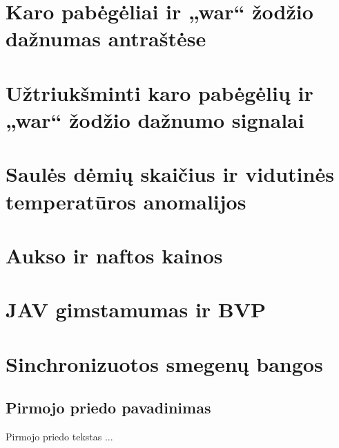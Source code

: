 \documentclass[a4paper,12pt,fleqn]{article}
\begin{document}
    {}{}{}{}%
    {}

    \tableofcontents

    

    \section{Karo pabėgėliai ir „war“ žodžio dažnumas antraštėse}
    \label{sec:refugees}
    

    \section{Užtriukšminti karo pabėgėlių ir „war“ žodžio dažnumo signalai}
    \label{sec:noisy-refugees}
    

    \section{Saulės dėmių skaičius ir vidutinės temperatūros anomalijos}
    \label{sec:sunspots}
    

    \section{Aukso ir naftos kainos}
    \label{sec:oil-gold}
    

    \section{JAV gimstamumas ir BVP}
    \label{sec:gdp-births}
    

    \section{Sinchronizuotos smegenų bangos}
    \label{sec:brainwaves}
    

    





    \newpage
    \begin{appendices}
        \section{Pirmojo priedo pavadinimas}
        \label{app:a}
        Pirmojo priedo tekstas ...

    \end{appendices}
\end{document}
